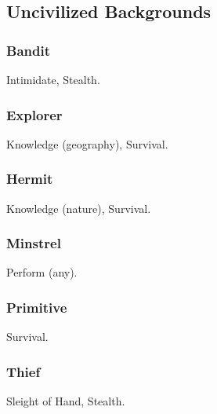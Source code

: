 \subsection{Uncivilized Backgrounds}

\subsubsection{Bandit}
 Intimidate, Stealth.

\subsubsection{Explorer}
 Knowledge (geography), Survival.

\subsubsection{Hermit}
 Knowledge (nature), Survival.

\subsubsection{Minstrel}
 Perform (any).

\subsubsection{Primitive}
 Survival.

\subsubsection{Thief}
 Sleight of Hand, Stealth.

